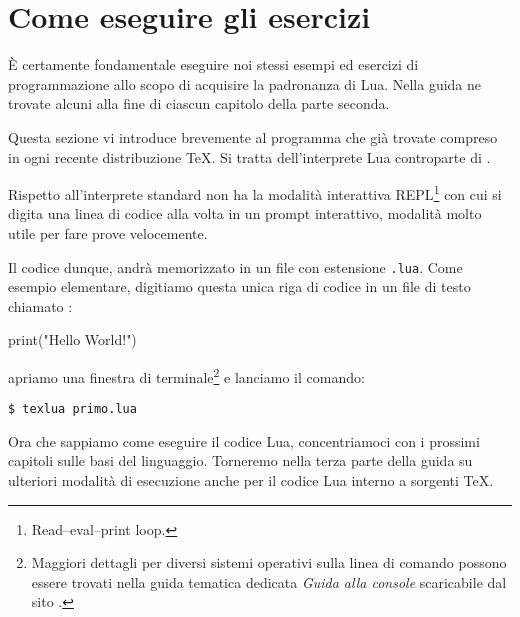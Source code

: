 

\chapter{Come eseguire gli esercizi}

È certamente fondamentale eseguire noi stessi esempi ed esercizi di
programmazione allo scopo di acquisire la padronanza di Lua. Nella guida ne
trovate alcuni alla fine di ciascun capitolo della parte seconda. 

Questa sezione vi introduce brevemente al programma  che già
trovate compreso in ogni recente distribuzione \TeX{}. Si tratta dell'interprete
Lua controparte di .

Rispetto all'interprete  standard  non ha la modalità
interattiva REPL\footnote{Read–eval–print loop.} con cui si digita una linea di
codice alla volta in un prompt interattivo, modalità molto utile per fare prove
velocemente.

Il codice dunque, andrà memorizzato in un file con estensione \texttt{.lua}.
Come esempio elementare, digitiamo questa unica riga di codice in un file
di testo chiamato :
\begin{lines}
print("Hello World!")
\end{lines}
apriamo una finestra di terminale\footnote{Maggiori dettagli per diversi sistemi
operativi sulla linea di comando possono essere trovati nella guida tematica
dedicata \emph{Guida alla console} scaricabile dal sito \GuIT.} e lanciamo il
comando:
\begin{Verbatim}[numbers=none,xleftmargin=0pt]
$ texlua primo.lua
\end{Verbatim}

Ora che sappiamo come eseguire il codice Lua, concentriamoci con i prossimi
capitoli sulle basi del linguaggio. Torneremo nella terza parte della guida su
ulteriori modalità di esecuzione anche per il codice Lua interno a sorgenti
\TeX.


